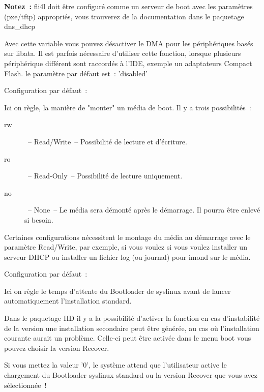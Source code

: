 \begin{description}
  \textbf{Notez~:} fli4l doit être configuré comme un serveur de boot avec
  les paramètres (pxe/tftp) appropriés, vous trouverez de la documentation
  dans le paquetage dns\_dhcp


  Avec cette variable vous pouvez désactiver le DMA pour les périphériques basés
  sur libata. Il est parfois nécessaire d'utiliser cette fonction, lorsque
  plusieurs périphérique différent sont raccordés à l'IDE, exemple un adaptateurs
  Compact Flash. le paramètre par défaut est~: 'disabled'


    Configuration par défaut~: 

  {Ici on règle, la manière de "monter" un média de boot. Il y a trois possibilités~:

    \begin{description}
    \item[rw]~-- Read/Write~-- Possibilité de lecture et d'écriture.
    \item[ro]~-- Read-Only~-- Possibilité de lecture uniquement.
    \item[no]~-- None~-- Le média sera démonté après le démarrage. Il pourra
    être enlevé si besoin.
    \end{description}

    Certaines configurations nécessitent le montage du média au démarrage
    avec le paramètre Read/Write, par exemple, si vous voulez si vous voulez
    installer un serveur DHCP ou installer un fichier log (ou journal)
    pour imond sur le média.}


    Configuration par défaut~: 

  {Ici on règle le temps d'attente du Bootloader de syslinux avant de lancer
   automatiquement l'installation standard.

    Dans le paquetage HD il y a la possibilité d'activer la fonction 
    en cas d'instabilité de la version une installation secondaire peut être générée,
    au cas où l'installation courante aurait un problème. Celle-ci peut être
    activée dans le menu boot vous pouvez choisir la version Recover.

    Si vous mettez la valeur '0', le système attend que l'utilisateur active
    le chargement du Bootloader syslinux standard ou la version Recover
    que vous avez sélectionnée~!}


\end{description}
